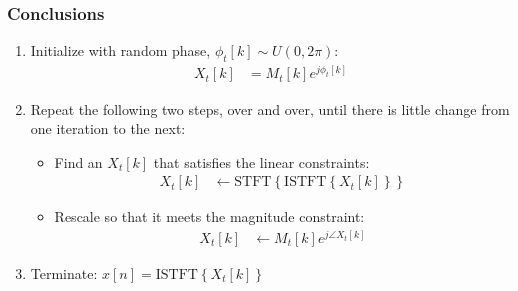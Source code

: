 \documentclass{beamer}
\begin{document}
\begin{frame}
  \frametitle{Conclusions}
  \begin{enumerate}
  \item Initialize with random phase, $\phi_t[k]\sim U(0,2\pi)$:
    \begin{align*}
      X_t[k] &= M_t[k]e^{j\phi_t[k]}
    \end{align*}
  \item Repeat the following two steps, over and over, until there is
    little change from one iteration to the next:
    \begin{itemize}
    \item Find an $X_t[k]$ that satisfies the linear constraints:
      \begin{align*}
        X_t[k] &\leftarrow \text{STFT}\left\{\text{ISTFT}\left\{X_t[k]\right\}\right\}
      \end{align*}
    \item Rescale so that it meets the magnitude constraint:
      \begin{align*}
        X_t[k] &\leftarrow M_t[k]e^{j\angle X_t[k]}
      \end{align*}
    \end{itemize}
    \item Terminate: $x[n]=\text{ISTFT}\left\{X_t[k]\right\}$
  \end{enumerate}
\end{frame}  
\end{document}
